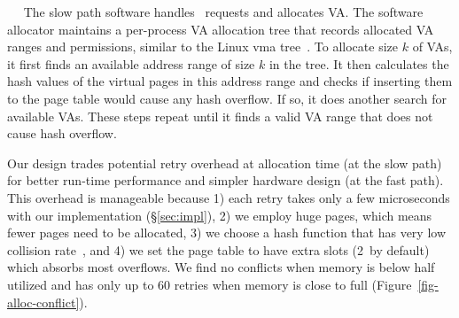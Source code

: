 ~~
The slow path software handles \alloc\ requests and allocates VA.
The software allocator maintains a per-process VA allocation tree that records allocated VA ranges and permissions, similar to the Linux vma tree~\cite{linux-rb-vma}.
To allocate size $k$ of VAs, it first finds an available address range of size $k$ in the tree.
It then calculates the hash values of the virtual pages in this address range
and checks if inserting them to the page table would cause any hash overflow. 
If so, it %
does another search for available VAs.
These steps repeat until it finds a valid VA range that does not cause hash overflow.

Our design trades potential retry overhead at allocation time (at the slow path) for better run-time performance and simpler hardware design (at the fast path).
This overhead is manageable because
1) each retry takes only a few microseconds with our implementation (\S\ref{sec:impl}),
2) we employ huge pages, which means fewer pages need to be allocated, 
3) we choose a hash function that has very low collision rate~\cite{lookup3-wiki},
and 4) we set the page table to have extra slots (2\x\ by default) which absorbs most overflows.
We find no conflicts when memory is below half utilized and has only up to 60 retries when memory is close to full (Figure~\ref{fig-alloc-conflict}).


